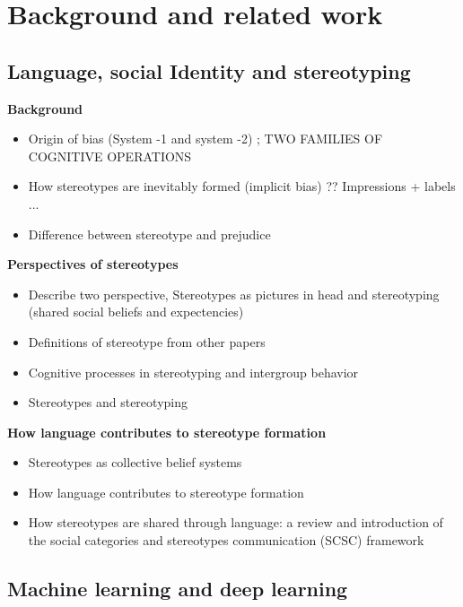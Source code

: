 \chapter{Background and related work}

\section{Language, social Identity and stereotyping}

\textbf{Background}
\begin{itemize}
    \item Origin of bias (System -1 and system -2) ; TWO FAMILIES OF COGNITIVE OPERATIONS \cite{kahneman2002representativeness}
    \item  How stereotypes are inevitably formed (implicit bias) ??
    Impressions + labels ...
    \cite{fiske1998stereotyping}
    \item Difference between stereotype and prejudice \cite{fiske1998stereotyping}
\end{itemize}
\textbf{Perspectives of stereotypes}
\begin{itemize}
    \item Describe two perspective, Stereotypes as pictures in head and stereotyping (shared social beliefs and expectencies) 
    \item Definitions of stereotype from other papers
    \item Cognitive processes in stereotyping and intergroup behavior \cite{hamilton2015cognitive}
    \item Stereotypes and stereotyping \cite{macrae1996stereotypes}
\end{itemize}
\textbf{How language contributes to stereotype formation}
    \begin{itemize}
        \item Stereotypes as collective belief systems \cite{macrae1996stereotypes}
        \item How language contributes to stereotype formation \cite{burgers2020language}
        \item How stereotypes are shared through language: a
    review and introduction of the social categories
    and stereotypes communication (SCSC) framework \cite{beukeboom2019stereotypes}
    \end{itemize}
\section{Machine learning and deep learning}
